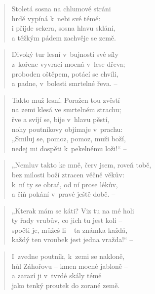 \begin{verse}
Stoletá sosna na chlumové stráni \\
hrdě vypíná k~nebi své témě: \\
i přijde sekera, sosna hlavu sklání, \\
a těžkým pádem zachvěje se země.
\end{verse}

\begin{verse}
Divoký tur lesní v~bujnosti své síly \\
z~kořene vyvrací mocná v~lese dřeva; \\
proboden oštěpem, potácí se chvíli, \\
a padne, v~bolesti smrtelné řeva. --
\end{verse}

\begin{verse}
Takto muž lesní. Poražen tou zvěstí \\
na zemi klesá ve smrtelném strachu; \\
řve a svíjí se, bije v~hlavu pěstí, \\
nohy poutníkovy objímaje v~prachu: \\
„Smiluj se, pomoz, pomoz, muži boží, \\
nedej mi dospěti k~pekelnému loži!“ --
\end{verse}

\begin{verse}
„Nemluv takto ke mně, červ jsem, roveň tobě, \\
bez milosti boží ztracen věčně věkův: \\
k~ní ty se obrať, od ní prose lékův, \\
a čiň pokání v~pravé ještě době. --
\end{verse}

\begin{verse}
„Kterak mám se káti? Viz tu na mé holi \\
ty řady vrubův, co jich tu jest koli -- \\
spočti je, můžeš-li -- ta známka každá, \\
každý ten vroubek jest jedna vražda!“ --
\end{verse}

\begin{verse}
I~zvedne poutník, k~zemi se nakloně, \\
hůl Záhořovu -- kmen mocné jabloně -- \\
a zarazí ji v~tvrdé skály témě \\
jako tenký proutek do zorané země.
\end{verse}

